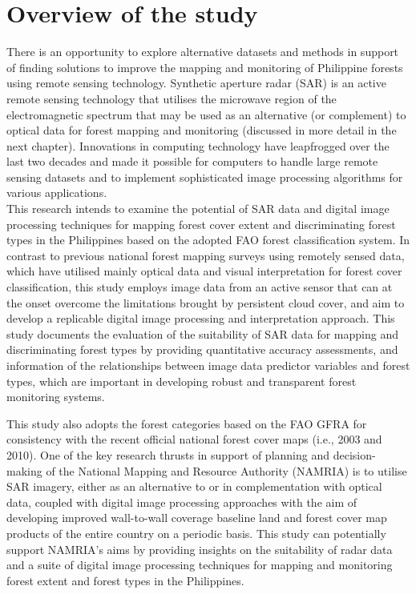 \section{Overview of the study}
\label{sec: intro-overview-study}

There is an opportunity to explore alternative datasets and methods in support of finding solutions to improve the mapping and monitoring of Philippine forests using remote sensing technology. Synthetic aperture radar (SAR) is an active remote sensing technology that utilises the microwave region of the electromagnetic spectrum that may be used as an alternative (or complement) to optical data for forest mapping and monitoring (discussed in more detail in the next chapter). Innovations in computing technology have leapfrogged over the last two decades and made it possible for computers to handle large remote sensing datasets and to implement sophisticated image processing algorithms for various applications.\\

This research intends to examine the potential of SAR data and digital image processing techniques for mapping forest cover extent and discriminating forest types in the Philippines based on the adopted FAO forest classification system. In contrast to previous national forest mapping surveys using remotely sensed data, which have utilised mainly optical data and visual interpretation for forest cover classification, this study employs image data from an active sensor that can at the onset overcome the limitations brought by persistent cloud cover, and aim to develop a replicable digital image processing and interpretation approach. This study documents the evaluation of the suitability of SAR data for mapping and discriminating forest types by providing quantitative accuracy assessments, and information of the relationships between image data predictor variables and forest types, which are important in developing robust and transparent forest monitoring systems.

This study also adopts the forest categories based on the FAO GFRA for consistency with the recent official national forest cover maps (i.e., 2003 and 2010). One of the key research thrusts in support of planning and decision-making of the National Mapping and Resource Authority (NAMRIA) is to utilise SAR imagery, either as an alternative to or in complementation with optical data, coupled with digital image processing approaches with the aim of developing improved wall-to-wall coverage baseline land and forest cover map products of the entire country on a periodic basis. This study can potentially support NAMRIA’s aims by providing insights on the suitability of radar data and a suite of digital image processing techniques for mapping and monitoring forest extent and forest types in the Philippines.

